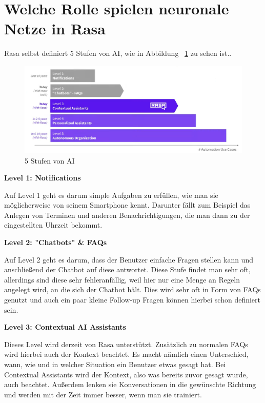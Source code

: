 \section{Welche Rolle spielen neuronale Netze in Rasa}

Rasa selbst definiert 5 Stufen von AI, wie in Abbildung ~\ref{fig:5_levels_of_ai} zu sehen ist.\@.\cite{ai5Levels}

\begin{figure}[hbt!]
    \centering
    \includegraphics[scale=0.25]{pics/5_levels_of_ai}
    \caption{5 Stufen von AI~\cite{ai5LevelsVideo}}
    \label{fig:5_levels_of_ai}
\end{figure}

\textbf{Level 1: Notifications}

Auf Level 1 geht es darum simple Aufgaben zu erfüllen, wie man sie möglicherweise von seinem Smartphone kennt.
Darunter fällt zum Beispiel das Anlegen von Terminen und anderen Benachrichtigungen, die man dann zu der eingestellten Uhrzeit bekommt.\cite{rasaMasterclass5Levels,ai5Levels,ai5LevelsVideo}

\textbf{Level 2: "Chatbots" \& FAQs}

Auf Level 2 geht es darum, dass der Benutzer einfache Fragen stellen kann und anschließend der Chatbot auf diese antwortet.
Diese Stufe findet man sehr oft, allerdings sind diese sehr fehleranfällig, weil hier nur eine Menge an Regeln angelegt wird, an die sich der Chatbot hält.
Dies wird sehr oft in Form von FAQs genutzt und auch ein paar kleine Follow-up Fragen können hierbei schon definiert sein.\cite{rasaMasterclass5Levels,ai5Levels,ai5LevelsVideo}

\textbf{Level 3: Contextual AI Assistants}

Dieses Level wird derzeit von Rasa unterstützt.
Zusätzlich zu normalen FAQs wird hierbei auch der Kontext beachtet.
Es macht nämlich einen Unterschied, wann, wie und in welcher Situation ein Benutzer etwas gesagt hat.
Bei Contextual Assistants wird der Kontext, also was bereits zuvor gesagt wurde, auch beachtet.
Außerdem lenken sie Konversationen in die gewünschte Richtung und werden mit der Zeit immer besser, wenn man sie trainiert.\cite{rasaMasterclass5Levels,ai5Levels,ai5LevelsVideo}


